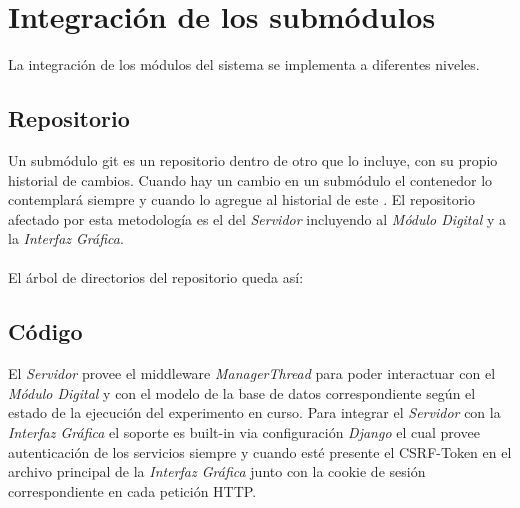 \section{Integraci\'on de los subm\'odulos}

La integraci\'on de los m\'odulos del sistema se implementa a diferentes niveles.

\subsection{Repositorio}

Un subm\'odulo git es un repositorio dentro de otro que lo incluye, con su propio historial de cambios. Cuando hay un cambio en un subm\'odulo el contenedor lo contemplar\'a siempre y cuando lo agregue al historial de este
\cite{git_submodules}.
El repositorio afectado por esta metodolog\'ia es el del \textit{Servidor} incluyendo al \textit{M\'odulo Digital} y a la \textit{Interfaz Gr\'afica}.
\\
\\
El \'arbol de directorios del repositorio queda as\'i:


\subsection{C\'odigo}
El \textit{Servidor} provee el middleware \textit{ManagerThread} para poder interactuar con el \textit{M\'odulo Digital} 
y con el modelo de la base de datos correspondiente seg\'un el estado de la ejecuci\'on del experimento en curso.
Para integrar el \textit{Servidor} con la \textit{Interfaz Gr\'afica} el soporte es built-in via configuraci\'on \textit{Django} el cual provee autenticaci\'on de los servicios siempre y cuando est\'e presente el CSRF-Token en el archivo principal de la \textit{Interfaz Gr\'afica}\cite{django_csrf} junto con la cookie de sesi\'on correspondiente en cada petici\'on HTTP\cite{django_cookie}.
\newpage

